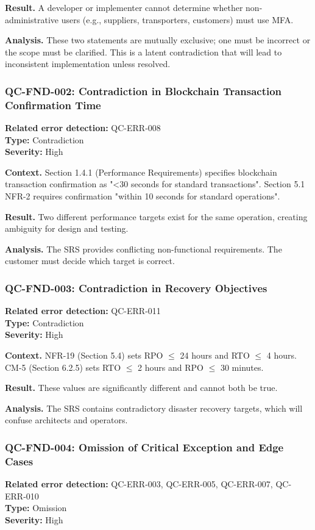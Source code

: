 \documentclass[11pt,a4paper]{article}
\begin{document}
\textbf{Result.} A developer or implementer cannot determine whether non-administrative users (e.g., suppliers, transporters, customers) must use MFA.

\textbf{Analysis.} These two statements are mutually exclusive; one must be incorrect or the scope must be clarified. This is a latent contradiction that will lead to inconsistent implementation unless resolved.

\subsubsection*{QC-FND-002: Contradiction in Blockchain Transaction Confirmation Time}
\textbf{Related error detection:} QC-ERR-008 \\
\textbf{Type:} Contradiction \\
\textbf{Severity:} High

\textbf{Context.} Section 1.4.1 (Performance Requirements) specifies blockchain transaction confirmation as "<30 seconds for standard transactions". Section 5.1 NFR-2 requires confirmation "within 10 seconds for standard operations".

\textbf{Result.} Two different performance targets exist for the same operation, creating ambiguity for design and testing.

\textbf{Analysis.} The SRS provides conflicting non-functional requirements. The customer must decide which target is correct.

\subsubsection*{QC-FND-003: Contradiction in Recovery Objectives}
\textbf{Related error detection:} QC-ERR-011 \\
\textbf{Type:} Contradiction \\
\textbf{Severity:} High

\textbf{Context.} NFR-19 (Section 5.4) sets RPO $\leq$ 24 hours and RTO $\leq$ 4 hours. CM-5 (Section 6.2.5) sets RTO $\leq$ 2 hours and RPO $\leq$ 30 minutes.

\textbf{Result.} These values are significantly different and cannot both be true.

\textbf{Analysis.} The SRS contains contradictory disaster recovery targets, which will confuse architects and operators.

\subsubsection*{QC-FND-004: Omission of Critical Exception and Edge Cases}
\textbf{Related error detection:} QC-ERR-003, QC-ERR-005, QC-ERR-007, QC-ERR-010 \\
\textbf{Type:} Omission \\
\textbf{Severity:} High
\end{document}
